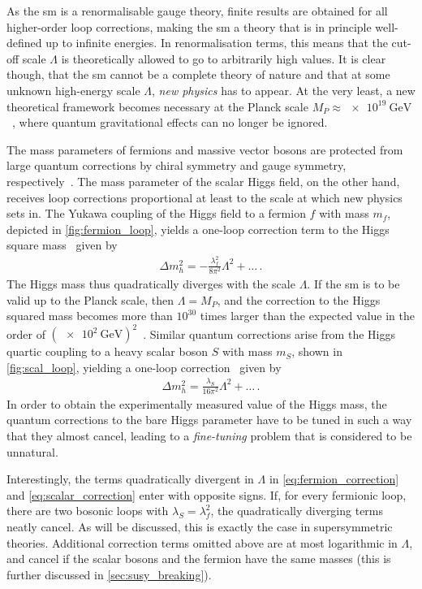 As the \gls{sm} is a renormalisable gauge theory, finite results are obtained for all higher-order loop corrections, making the \gls{sm} a theory that is in principle well-defined up to infinite energies. In renormalisation terms, this means that the cut-off scale $\Lambda$ is theoretically allowed to go to arbitrarily high values. It is clear though, that the \gls{sm} cannot be a complete theory of nature and that at some unknown high-energy scale $\Lambda$, \textit{new physics} has to appear. At the very least, a new theoretical framework becomes necessary at the Planck scale $M_P \approx \SI{e19}{\GeV}$~\cite{Bustamante:2009us}, where quantum gravitational effects can no longer be ignored.

The mass parameters of fermions and massive vector bosons are protected from large quantum corrections by chiral symmetry and gauge symmetry, respectively~\cite{Aitchison:2007fn}. The mass parameter of the scalar Higgs field, on the other hand, receives loop corrections proportional at least to the scale at which new physics sets in. The Yukawa coupling of the Higgs field to a fermion $f$ with mass $m_f$, depicted in \cref{fig:fermion_loop}, yields a one-loop correction term to the Higgs square mass~\cite{Bustamante:2009us} given by
\begin{align}
	\Delta m_h^2 = -\frac{\lambda_f^2}{8\pi^2} \Lambda^2 + \dots\, .
	\label{eq:fermion_correction}
\end{align}
The Higgs mass thus quadratically diverges with the scale $\Lambda$. If the \gls{sm} is to be valid up to the Planck scale, then $\Lambda = M_P$, and the correction to the Higgs squared mass becomes more than $10^{30}$ times larger than the expected value in the order of $(\SI{e2}{\GeV})^2$~\cite{Martin:1997ns}.
Similar quantum corrections arise from the Higgs quartic coupling to a heavy scalar boson $S$ with mass $m_S$, shown in \cref{fig:scal_loop}, yielding a one-loop correction~\cite{Bustamante:2009us} given by 
\begin{align}
	\Delta m_h^2 = \frac{\lambda_S}{16\pi^2}\Lambda^2 + \dots\, .
	\label{eq:scalar_correction}
\end{align}
In order to obtain the experimentally measured value of the Higgs mass, the quantum corrections to the bare Higgs parameter have to be tuned in such a way that they almost cancel, leading to a \textit{fine-tuning} problem that is considered to be unnatural.

Interestingly, the terms quadratically divergent in $\Lambda$ in \cref{eq:fermion_correction} and \cref{eq:scalar_correction} enter with opposite signs. If, for every fermionic loop, there are two bosonic loops with $\lambda_S = \lambda_f^2$, the quadratically diverging terms neatly cancel. As will be discussed, this is exactly the case in supersymmetric theories. Additional correction terms omitted above are at most logarithmic in $\Lambda$, and cancel if the scalar bosons and the fermion have the same masses (this is further discussed in \cref{sec:susy_breaking}).

